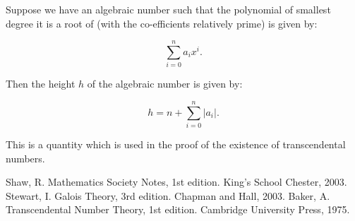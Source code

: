 \documentclass[12pt]{article}
\begin{document}
Suppose we have an algebraic number such that the polynomial of smallest degree it is a root of (with the co-efficients relatively prime) is given by:

$$
\sum_{i=0}^n a_i x^i .
$$

Then the height $h$ of the algebraic number is given by:

$$
h = n + \sum_{i=0}^n |a_i| .
$$

This is a quantity which is used in the proof of the existence of transcendental numbers.

\begin{thebibliography}{99}
 Shaw, R. Mathematics Society Notes, 1st edition. King's School Chester, 2003.
 Stewart, I. Galois Theory, 3rd edition. Chapman and Hall, 2003.
 Baker, A. Transcendental Number Theory, 1st edition. Cambridge University Press, 1975.
\end{thebibliography}
\end{document}
